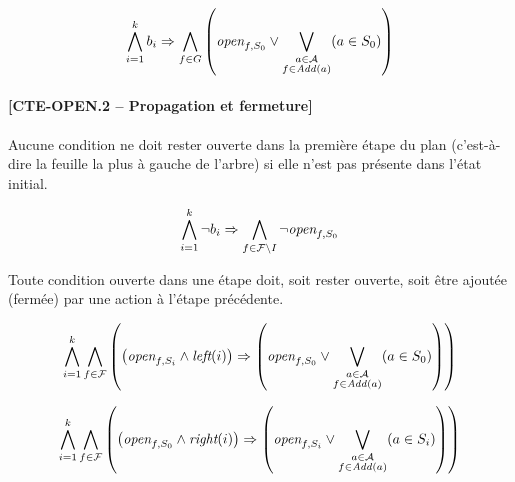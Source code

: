 \begin{small}
\[ \bigwedge\limits_{\substack{i=1}}^{k} b_{i} \Rightarrow \bigwedge\limits_{\substack{f\in G}} \left(\textit{open}_{f,S_{0}} \vee \bigvee\limits_{\substack{a \in \mathcal{A} \\ f \in \mathit{Add}(a)}} (a \in S_{0})\right) \]
\end{small}

\paragraph*{[CTE-OPEN.2 -- Propagation et fermeture]}

Aucune condition ne doit rester ouverte dans la première étape du plan (c'est-à-dire la feuille la plus à gauche de l'arbre) si elle n'est pas présente dans l'état initial.

\begin{small}
\[ \bigwedge\limits_{\substack{i=1}}^{k}\neg b_{i} \Rightarrow \bigwedge\limits_{\substack{f\in \mathcal{F}\setminus I}} \neg \textit{open}_{f,S_{0}} \]	
\end{small}

Toute condition ouverte dans une étape doit, soit rester ouverte, soit être ajoutée (fermée) par une action à l'étape précédente.

%

\begin{small}
\[ \bigwedge\limits_{\substack{i=1}}^{k} \bigwedge\limits_{\substack{f\in \mathcal{F}}} \left(\left(\textit{open}_{f,S_{i}} \wedge \textit{left}(i) \right) \Rightarrow \left(\textit{open}_{f,S_{0}} \vee \bigvee\limits_{\substack{a \in \mathcal{A} \\ f \in \mathit{Add}(a)}} (a \in S_{0})\right)\right) \]

\[ \bigwedge\limits_{\substack{i=1}}^{k}\bigwedge\limits_{\substack{f\in \mathcal{F}}}\left(\left(\textit{open}_{f,S_{0}} \wedge \textit{right}(i) \right) \Rightarrow \left(\textit{open}_{f,S_{i}} \vee \bigvee\limits_{\substack{a \in \mathcal{A} \\ f \in \mathit{Add}(a)}} (a \in S_{i})\right)\right)
\]
\end{small}


